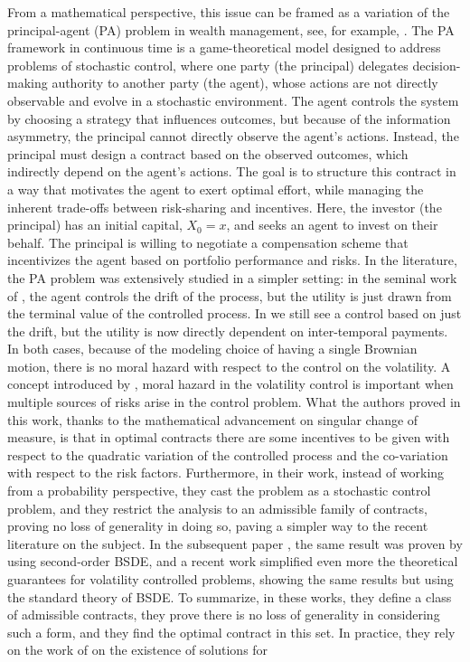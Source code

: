 \documentclass[11pt,a4paper]{article}
\theoremstyle{thmstyleone}%
\theoremstyle{thmstyletwo}%
\theoremstyle{thmstylethree}%
\begin{document}
From a mathematical perspective, this issue can be framed as a variation of the principal-agent (PA) problem in wealth management, see, for example, \cite{dalmacio2004agency,ou2003optimal,stracca2006delegated,demarzo2006optimal,li2009incentive,leung2014continuous,cvitanic2017moral}. The PA framework in continuous time is a game-theoretical model designed to address problems of stochastic control, where one party (the principal) delegates decision-making authority to another party (the agent), whose actions are not directly observable and evolve in a stochastic environment. The agent controls the system by choosing a strategy that influences outcomes, but because of the information asymmetry, the principal cannot directly observe the agent's actions. Instead, the principal must design a contract based on the observed outcomes, which indirectly depend on the agent's actions. The goal is to structure this contract in a way that motivates the agent to exert optimal effort, while managing the inherent trade-offs between risk-sharing and incentives. Here, the investor (the principal) has an initial capital, $X_0 = x$, and seeks an agent to invest on their behalf. The principal is willing to negotiate a compensation scheme that incentivizes the agent based on portfolio performance and risks. In the literature, the PA problem was extensively studied in a simpler setting: in the seminal work of \cite{holmstrom1987aggregation}, the agent controls the drift of the process, but the utility is just drawn from the terminal value of the controlled process. In \cite{sannikov2008continuous} we still see a control based on just the drift, but the utility is now directly dependent on inter-temporal payments. In both cases, because of the modeling choice of having a single Brownian motion, there is no moral hazard with respect to the control on the volatility. A concept introduced by \cite{cvitanic2017moral}, moral hazard in the volatility control is important when multiple sources of risks arise in the control problem. What the authors proved in this work, thanks to the mathematical advancement on singular change of measure, is that in optimal contracts there are some incentives to be given with respect to the quadratic variation of the controlled process and the co-variation with respect to the risk factors. Furthermore, in their work, instead of working from a probability perspective, they cast the problem as a stochastic control problem, and they restrict the analysis to an admissible family of contracts, proving no loss of generality in doing so, paving a simpler way to the recent literature on the subject. In the subsequent paper \cite{cvitanic2018dynamic}, the same result was proven by using second-order BSDE, and a recent work \cite{chiusolo2024new} simplified even more the theoretical guarantees for volatility controlled problems, showing the same results but using the standard theory of BSDE. To summarize, in these works, they define a class of admissible contracts, they prove there is no loss of generality in considering such a form, and they find the optimal contract in this set. In practice, they rely on the work of \cite{pardoux1990adapted,barles1997backward,el1997backward,pardoux2005backward,kobylanski2000backward,papapantoleon2018existence} on the existence of solutions for 
\end{document}
